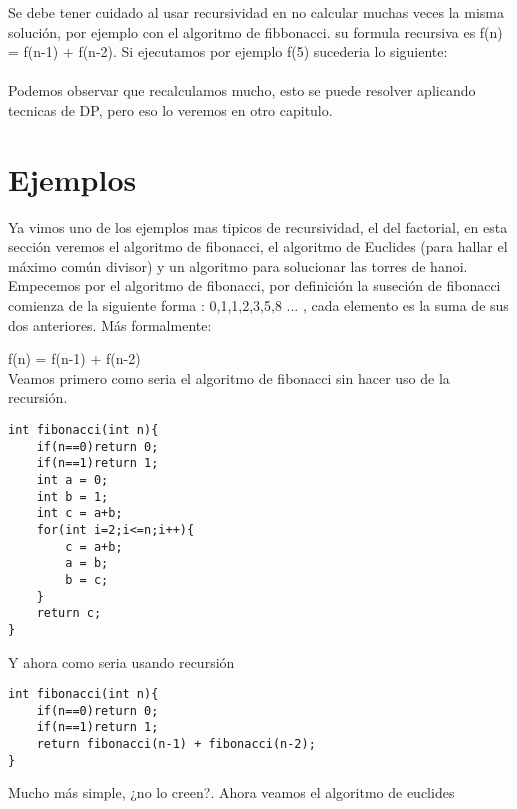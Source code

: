 Se debe tener cuidado al usar recursividad en no calcular muchas veces la misma solución, por ejemplo
con el algoritmo de fibbonacci. su formula recursiva es f(n) = f(n-1) + f(n-2). Si ejecutamos por ejemplo f(5) sucederia lo siguiente:
\\
\\Podemos observar que recalculamos mucho, esto se puede resolver aplicando tecnicas de DP, pero eso lo veremos en otro capitulo.

\section{Ejemplos}

Ya vimos uno de los ejemplos mas tipicos de recursividad, el del factorial, en esta sección veremos
el algoritmo de fibonacci, el algoritmo de Euclides (para hallar el máximo común divisor) y 
un algoritmo para solucionar las torres de hanoi.
\\Empecemos por el algoritmo de fibonacci, por definición la suseción de fibonacci comienza de la 
siguiente forma : 0,1,1,2,3,5,8 ... , cada elemento es la suma de sus dos anteriores. Más  formalmente:

f(n) = f(n-1) + f(n-2)
\\Veamos primero como seria el algoritmo de fibonacci sin hacer uso de la recursión.

\begin{minipage}{\textwidth}
\begin{lstlisting}[style=C,caption=fibonacciIterativo.cpp]
int fibonacci(int n){
    if(n==0)return 0;
    if(n==1)return 1;
    int a = 0;
    int b = 1;
    int c = a+b;
    for(int i=2;i<=n;i++){
        c = a+b;
        a = b;
        b = c;
    }
    return c;
}
\end{lstlisting}
\end{minipage}

Y ahora como seria usando recursión

\begin{minipage}{\textwidth}
\begin{lstlisting}[style=C,caption=fibonacciRecursivo.cpp]
int fibonacci(int n){
    if(n==0)return 0;
    if(n==1)return 1;
    return fibonacci(n-1) + fibonacci(n-2);
}
\end{lstlisting}
\end{minipage}

Mucho más simple, ¿no lo creen?. Ahora veamos el algoritmo de euclides

